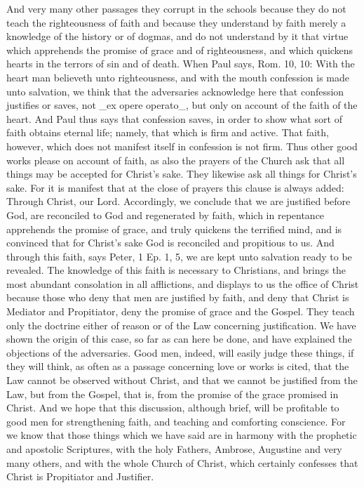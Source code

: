 And very many other passages they corrupt in the schools because they
do not teach the righteousness of faith and because they understand
by faith merely a knowledge of the history or of dogmas, and do not
understand by it that virtue which apprehends the promise of grace
and of righteousness, and which quickens hearts in the terrors of sin
and of death.  When Paul says, Rom. 10, 10: With the heart man
believeth unto righteousness, and with the mouth confession is made
unto salvation, we think that the adversaries acknowledge here that
confession justifies or saves, not _ex opere operato_, but only on
account of the faith of the heart.  And Paul thus says that
confession saves, in order to show what sort of faith obtains eternal
life; namely, that which is firm and active.  That faith, however,
which does not manifest itself in confession is not firm.  Thus other
good works please on account of faith, as also the prayers of the
Church ask that all things may be accepted for Christ's sake.  They
likewise ask all things for Christ's sake.  For it is manifest that
at the close of prayers this clause is always added: Through Christ,
our Lord.  Accordingly, we conclude that we are justified before God,
are reconciled to God and regenerated by faith, which in repentance
apprehends the promise of grace, and truly quickens the terrified
mind, and is convinced that for Christ's sake God is reconciled and
propitious to us.  And through this faith, says Peter, 1 Ep. 1, 5, we
are kept unto salvation ready to be revealed.  The knowledge of this
faith is necessary to Christians, and brings the most abundant
consolation in all afflictions, and displays to us the office of
Christ because those who deny that men are justified by faith, and
deny that Christ is Mediator and Propitiator, deny the promise of
grace and the Gospel.  They teach only the doctrine either of reason
or of the Law concerning justification.  We have shown the origin of
this case, so far as can here be done, and have explained the
objections of the adversaries.  Good men, indeed, will easily judge
these things, if they will think, as often as a passage concerning
love or works is cited, that the Law cannot be observed without
Christ, and that we cannot be justified from the Law, but from the
Gospel, that is, from the promise of the grace promised in Christ.
And we hope that this discussion, although brief, will be profitable
to good men for strengthening faith, and teaching and comforting
conscience.  For we know that those things which we have said are in
harmony with the prophetic and apostolic Scriptures, with the holy
Fathers, Ambrose, Augustine and very many others, and with the whole
Church of Christ, which certainly confesses that Christ is
Propitiator and Justifier.

